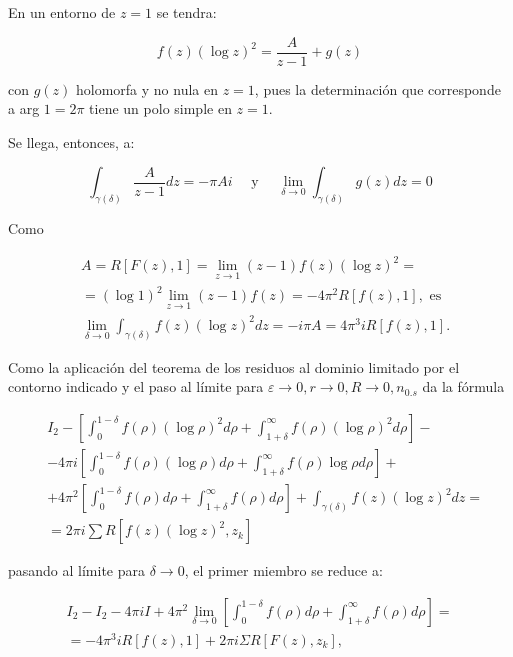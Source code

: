\documentclass[10pt]{article}
\theoremstyle{plain}
\theoremstyle{definition}
\theoremstyle{remark}
\begin{document}
En un entorno de $z=1$ se tendra:

$$
f(z)(\log z)^{2}=\frac{A}{z-1}+g(z)
$$

con $g(z)$ holomorfa y no nula en $z=1$, pues la determinación que corresponde a arg $1=2 \pi$ tiene un polo simple en $z=1$.

Se llega, entonces, a:

$$
\int_{\gamma(\delta)} \frac{A}{z-1} d z=-\pi A i \quad \text { y } \quad \lim _{\delta \rightarrow 0} \int_{\gamma(\delta)} g(z) d z=0
$$

Como

$$
\begin{aligned}
& A=R[F(z), 1]=\lim _{z \rightarrow 1}(z-1) f(z)(\log z)^{2}= \\
&=(\log 1)^{2} \lim _{z \rightarrow 1}(z-1) f(z)=-4 \pi^{2} R[f(z), 1], \text { es } \\
& \lim _{\delta \rightarrow 0} \int_{\gamma(\delta)} f(z)(\log z)^{2} d z=-i \pi A=4 \pi^{3} i R[f(z), 1] .
\end{aligned}
$$

Como la aplicación del teorema de los residuos al dominio limitado por el contorno indicado y el paso al límite para $\varepsilon \rightarrow 0, r \rightarrow 0, R \rightarrow 0, n_{0 . s}$ da la fórmula


\begin{align*}
& I_{2}-\left[\int_{0}^{1-\delta} f(\rho)(\log \rho)^{2} d \rho+\int_{1+\delta}^{\infty} f(\rho)(\log \rho)^{2} d \rho\right]- \\
& -4 \pi i\left[\int_{0}^{1-\delta} f(\rho)(\log \rho) d \rho+\int_{1+\delta}^{\infty} f(\rho) \log \rho d \rho\right]+ \\
& +4 \pi^{2}\left[\int_{0}^{1-\delta} f(\rho) d \rho+\int_{1+\delta}^{\infty} f(\rho) d \rho\right]+\int_{\gamma(\delta)} f(z)(\log z)^{2} d z= \\
& =2 \pi i \sum R\left[f(z)(\log z)^{2}, z_{k}\right] \tag{27-11}
\end{align*}


pasando al límite para $\delta \rightarrow 0$, el primer miembro se reduce a:

$$
\begin{gathered}
I_{2}-I_{2}-4 \pi i I+4 \pi^{2} \lim _{\delta \rightarrow 0}\left[\int_{0}^{1-\delta} f(\rho) d \rho+\int_{1+\delta}^{\infty} f(\rho) d \rho\right]= \\
=-4 \pi^{3} i R[f(z), 1]+2 \pi i \Sigma R\left[F(z), z_{k}\right],
\end{gathered}
$$
\end{document}
